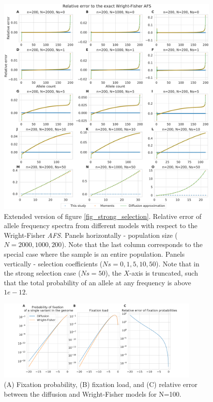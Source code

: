 \documentclass[review,nonatbib]{elsarticle}
\begin{document}
\begin{figure}[H]
  \centering
  \includegraphics[width=\textwidth]{fig/afs_comp_big.pdf}

    \caption{Extended version of figure \ref{fig_strong_selection}. Relative error of allele
    frequency spectra from different models with respect to the Wright-Fisher \textit{AFS}. Panels
    horizontally - population size ($N=2000,1000,200$). Note that the last column corresponds to the
    special case where the sample is an entire population. Panels vertically - selection
    coefficients ($Ns=0,1,5,10,50$). Note that in the strong selection case ($Ns=50$), the $X$-axis
    is truncated, such that the total probability of an allele at any frequency is above $1e-12$.
    }

  \label{fig_apx_strong_selection_extended}
\end{figure}

\begin{figure}[H]
  \centering
  \includegraphics[width=0.9\textwidth]{fig/fixation_rate_N_100.pdf}

    \caption{(A) Fixation probability, (B) fixation load, and (C) relative error between the
    diffusion and Wright-Fisher models for N=100.}

  \label{fig_apx_fixation_100}

\end{figure}
\end{document}
